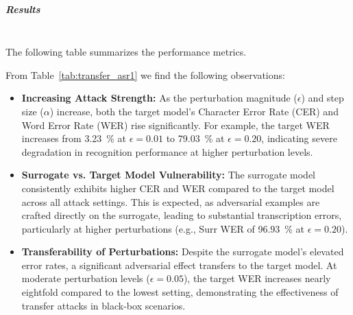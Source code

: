 \documentclass[../main.tex]{subfiles}
\begin{document}
\subparagraph{Results}\leavevmode\\
The following table summarizes the performance metrics.

\begin{table}[h]
\centering
\small
\caption{Performance Metrics for Black-Box Transfer Attacks}
\label{tab:transfer_asr1}
\end{table}

From Table~\ref{tab:transfer_asr1} we find the following observations:
\begin{itemize}
\item \textbf{Increasing Attack Strength:} As the perturbation magnitude (\(\epsilon\)) and step size (\(\alpha\)) increase, both the target model’s Character Error Rate (CER) and Word Error Rate (WER) rise significantly. For example, the target WER increases from \SI{3.23}{\percent} at \(\epsilon=0.01\) to \SI{79.03}{\percent} at \(\epsilon=0.20\), indicating severe degradation in recognition performance at higher perturbation levels.
\item \textbf{Surrogate vs. Target Model Vulnerability:} The surrogate model consistently exhibits higher CER and WER compared to the target model across all attack settings. This is expected, as adversarial examples are crafted directly on the surrogate, leading to substantial transcription errors, particularly at higher perturbations (e.g., Surr WER of \SI{96.93}{\percent} at \(\epsilon=0.20\)).
\item \textbf{Transferability of Perturbations:} Despite the surrogate model’s elevated error rates, a significant adversarial effect transfers to the target model. At moderate perturbation levels (\(\epsilon=0.05\)), the target WER increases nearly eightfold compared to the lowest setting, demonstrating the effectiveness of transfer attacks in black-box scenarios.
\end{itemize}
\end{document}
